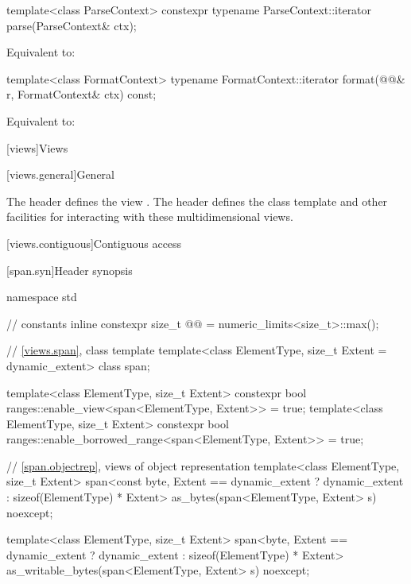 %
\begin{itemdecl}
template<class ParseContext>
  constexpr typename ParseContext::iterator
    parse(ParseContext& ctx);
\end{itemdecl}

\begin{itemdescr}
\pnum
\effects
Equivalent to: 
\end{itemdescr}

%
\begin{itemdecl}
template<class FormatContext>
  typename FormatContext::iterator
    format(@@& r, FormatContext& ctx) const;
\end{itemdecl}

\begin{itemdescr}
\pnum
\effects
Equivalent to: 
\end{itemdescr}

[views]{Views}

[views.general]{General}

\pnum
The header  defines the view .
The header  defines the class template  and
other facilities for interacting with these multidimensional views.

[views.contiguous]{Contiguous access}

[span.syn]{Header  synopsis}%

%
\begin{codeblock}
namespace std {
  // constants
  inline constexpr size_t @@ = numeric_limits<size_t>::max();

  // \ref{views.span}, class template 
  template<class ElementType, size_t Extent = dynamic_extent>
    class span;

  template<class ElementType, size_t Extent>
    constexpr bool ranges::enable_view<span<ElementType, Extent>> = true;
  template<class ElementType, size_t Extent>
    constexpr bool ranges::enable_borrowed_range<span<ElementType, Extent>> = true;

  // \ref{span.objectrep}, views of object representation
  template<class ElementType, size_t Extent>
    span<const byte, Extent == dynamic_extent ? dynamic_extent : sizeof(ElementType) * Extent>
      as_bytes(span<ElementType, Extent> s) noexcept;

  template<class ElementType, size_t Extent>
    span<byte, Extent == dynamic_extent ? dynamic_extent : sizeof(ElementType) * Extent>
      as_writable_bytes(span<ElementType, Extent> s) noexcept;
}
\end{codeblock}

